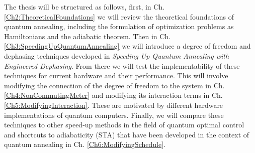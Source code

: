 \qquad The thesis will be structured as follows, first, in Ch. \ref{Ch2:TheoreticalFoundations} we will review the theoretical foundations of quantum annealing, including the formulation of optimization problems as Hamiltonians and the adiabatic theorem. Then in Ch. \ref{Ch3:SpeedingUpQuantumAnnealing} we will introduce a degree of freedom and dephasing techniques developed in \textit{Speeding Up Quantum Annealing with Engineered Dephasing}\cite{DephasingPaper}. From there we will test the implementability of these techniques for current hardware and their performance. This will involve modifying the connection of the degree of freedom to the system in Ch. \ref{Ch4:NonCommutingMeter} and modifying its interaction terms in Ch. \ref{Ch5:ModifyingInteraction}. These are motivated by different hardware implementations of quantum computers. \color{red} Finally, we will compare these techniques to other speed-up methods in the field of quantum optimal control and shortcuts to adiabaticity (STA) that have been developed in the context of quantum annealing in Ch. \ref{Ch6:ModifyingSchedule}. \color{black}